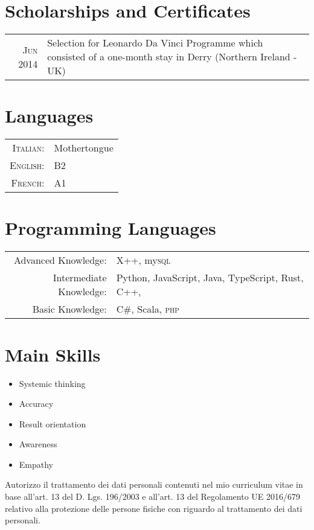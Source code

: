 \documentclass[a4paper,10pt]{article}
\begin{document}
\section{Scholarships and Certificates} %
\begin{tabular}{r p{12cm}}
 	\textsc{Jun 2014} & Selection for Leonardo Da Vinci Programme which consisted of a one-month stay in Derry (Northern Ireland - UK)  \\
\end{tabular}

\section{Languages}
\begin{tabular}{rl}
 \textsc{Italian:}&Mothertongue\\
\textsc{English:}& B2 \\
\textsc{French:}& A1 \\
\end{tabular}

\section{Programming Languages}
\begin{tabular}{rl}
 Advanced Knowledge:& X++, my\textsc{sql} \\
 Intermediate Knowledge:& Python, JavaScript,  Java, TypeScript, Rust, C++,  \\
 Basic Knowledge:& C\#, Scala, \textsc{php} \\
\end{tabular}

\section{Main Skills}
\begin{itemize}
	\itemsep -0.5em 
	\item Systemic thinking
	\item Accuracy
	\item Result orientation
	\item Awareness
	\item Empathy
\end{itemize}
\vspace{2cm}
Autorizzo il trattamento dei dati personali contenuti nel mio curriculum vitae in base all’art. 13 del D. Lgs. 196/2003 e all’art. 13 del Regolamento UE 2016/679 relativo alla protezione delle persone fisiche con riguardo al trattamento dei dati personali.
\end{document}
